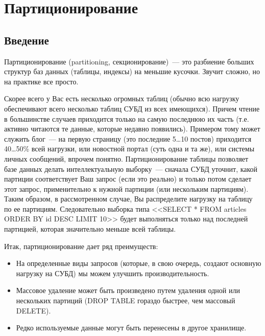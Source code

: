 \chapter{Партиционирование}
\begin{epigraphs}
\end{epigraphs}
\section{Введение}
Партиционирование (partitioning, секционирование)~--- это разбиение больших структур баз данных (таблицы, индексы) на меньшие кусочки.
Звучит сложно, но на практике все просто.

Скорее всего у Вас есть несколько огромных таблиц (обычно всю нагрузку обеспечивают всего несколько таблиц СУБД из всех имеющихся).
Причем чтение в большинстве случаев приходится только на самую последнюю их часть (т.е. активно читаются те данные, которые
недавно появились). Примером тому может служить блог~--- на первую страницу (это последние 5\dots10 постов) приходится 40\dots50\%
всей нагрузки, или новостной портал (суть одна и та же), или системы личных сообщений, впрочем понятно. Партиционирование
таблицы позволяет базе данных делать интеллектуальную выборку~--- сначала СУБД уточнит, какой партиции соответствует Ваш запрос
(если это реально) и только потом сделает этот запрос, применительно к нужной партиции (или нескольким партициям). Таким образом,
в рассмотренном случае, Вы распределите нагрузку на таблицу по ее партициям. Следовательно выборка типа
<<SELECT * FROM articles ORDER BY id DESC LIMIT 10>> будет выполняться только над последней партицией, которая значительно
меньше всей таблицы.

Итак, партиционирование дает ряд преимуществ:
\begin{itemize}
\item На определенные виды запросов (которые, в свою очередь, создают основную нагрузку на СУБД) мы можем улучшить производительность.
\item Массовое удаление может быть произведено путем удаления одной или нескольких партиций
(DROP TABLE гораздо быстрее, чем массовый DELETE).
\item Редко используемые данные могут быть перенесены в другое хранилище.
\end{itemize}

